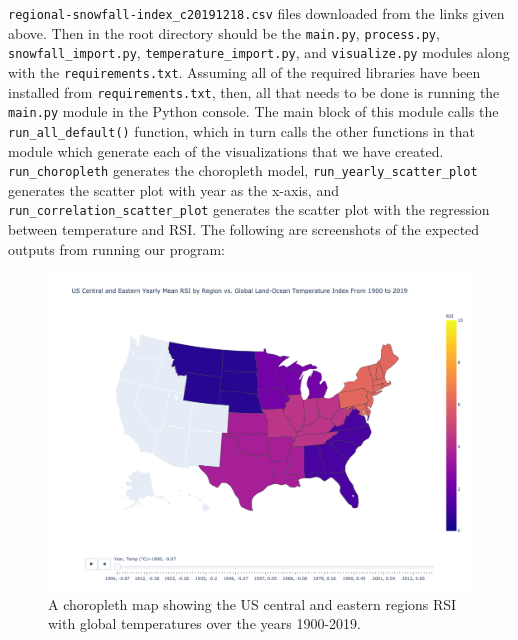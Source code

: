 \documentclass[fontsize=11pt]{article}
\begin{document}
\noindent \texttt{regional-snowfall-index\_c20191218.csv} files downloaded from the links given above. Then in the root directory should be the \texttt{main.py}, \texttt{process.py}, \texttt{snowfall\_import.py}, \texttt{temperature\_import.py}, and \texttt{visualize.py} modules along with the \texttt{requirements.txt}. Assuming all of the required libraries have been installed from \texttt{requirements.txt}, then, all that needs to be done is running the \texttt{main.py} module in the Python console. The main block of this module calls the \texttt{run\_all\_default()} function, which in turn calls the other functions in that module which generate each of the visualizations that we have created. \texttt{run\_choropleth} generates the choropleth model, \texttt{run\_yearly\_scatter\_plot} generates the scatter plot with year as the x-axis, and \texttt{run\_correlation\_scatter\_plot} generates the scatter plot with the regression between temperature and RSI. 
The following are screenshots of the expected outputs from running our program:\\
\begin{figure}[h]
    \centering
    \includegraphics[scale=.35]{choropleth.png}
    \caption{A choropleth map showing the US central and eastern regions RSI with global temperatures over the years 1900-2019.}
    \label{fig:my_label}
\end{figure}

\newpage
\end{document}
